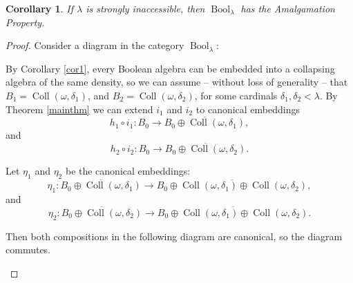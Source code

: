 \documentclass[11pt]{amsart}
\newtheorem{cor}[thm]{Corollary}
\theoremstyle{definition}
\DeclareMathOperator{\Bool}{Bool}
\newcommand{\col}{\operatorname{Coll}}
\begin{document}
\begin{cor}\label{coramalgamation}
	If $\lambda$ is strongly inaccessible, then $\Bool_\lambda$ has the Amalgamation Property.
\end{cor}
\begin{proof}
    Consider a diagram in the category $\Bool_\lambda$:
    \begin{center}
		\end{center}
        By Corollary \ref{cor1}, every Boolean algebra can be embedded into a collapsing algebra of the same density, so we can assume -- without loss of generality -- that $B_1=\col(\omega,\delta_1)$, and $B_2=\col(\omega,\delta_2)$, for some cardinals $\delta_1,\delta_2<\lambda$.
        By Theorem \ref{mainthm} we can extend $i_1$ and $i_2$ to canonical embeddings
        $$h_1\circ i_1:B_0 \longrightarrow \overline{B_0\oplus \col(\omega,\delta_1)},$$
        and
        $$h_2\circ i_2:B_0 \longrightarrow \overline{B_0\oplus \col(\omega,\delta_2)}.$$

        Let $\eta_1$ and $\eta_2$ be the canonical embeddings:
        $$\eta_1:\overline{B_0\oplus \col(\omega,\delta_1)}\longrightarrow \overline{B_0\oplus \col(\omega,\delta_1)\oplus \col(\omega,\delta_2)},$$
        and
        $$\eta_2:\overline{B_0\oplus \col(\omega,\delta_2)}\longrightarrow \overline{B_0\oplus \col(\omega,\delta_1)\oplus \col(\omega,\delta_2)}.$$

        Then both compositions in the following diagram are canonical, so the diagram commutes.
        
        \begin{center}
		\end{center}
        
\end{proof}
\end{document}
